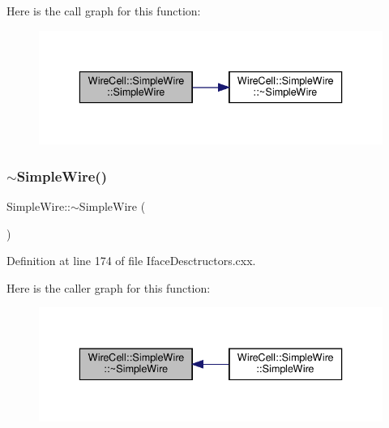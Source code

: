 Here is the call graph for this function\+:
\nopagebreak
\begin{figure}[H]
\begin{center}
\leavevmode
\includegraphics[width=336pt]{class_wire_cell_1_1_simple_wire_a22c2fdb5b8d74747e273e8854cabf691_cgraph}
\end{center}
\end{figure}
\mbox{\label{class_wire_cell_1_1_simple_wire_a9be6fb69d27f23c5e08d6f3c513a8e59}} 
\subsubsection{\texorpdfstring{$\sim$\+Simple\+Wire()}{~SimpleWire()}}
{\footnotesize\ttfamily Simple\+Wire\+::$\sim$\+Simple\+Wire (\begin{DoxyParamCaption}{ }\end{DoxyParamCaption})\hspace{0.3cm}{\ttfamily [virtual]}}



Definition at line 174 of file Iface\+Desctructors.\+cxx.

Here is the caller graph for this function\+:
\nopagebreak
\begin{figure}[H]
\begin{center}
\leavevmode
\includegraphics[width=336pt]{class_wire_cell_1_1_simple_wire_a9be6fb69d27f23c5e08d6f3c513a8e59_icgraph}
\end{center}
\end{figure}



